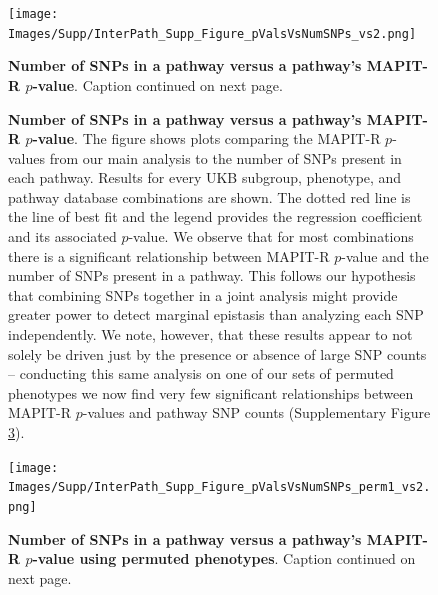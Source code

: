 \documentclass[12pt,a4paper]{article}
\begin{document}
\setlength{\footskip}{3cm}
\begin{figure}[htbp]
\centering
\vspace*{-2cm}
\texttt{[image: Images/Supp/InterPath\_Supp\_Figure\_pValsVsNumSNPs\_vs2.png]}
\caption[TBD]{\textbf{Number of SNPs in a pathway versus a pathway's MAPIT-R $p$-value}. Caption continued on next page.}
\label{InterPath-Supp-Figure-pValsVsNumSNPs}
\end{figure}
\clearpage
\setlength{\footskip}{1cm}

\addtocounter{figure}{-1}
\begin{figure} [t!]
  \caption{\textbf{Number of SNPs in a pathway versus a pathway's MAPIT-R $p$-value}. The figure shows plots comparing the MAPIT-R $p$-values from our main analysis to the number of SNPs present in each pathway. Results for every UKB subgroup, phenotype, and pathway database combinations are shown. The dotted red line is the line of best fit and the legend provides the regression coefficient and its associated $p$-value. We observe that for most combinations there is a significant relationship between MAPIT-R $p$-value and the number of SNPs present in a pathway. This follows our hypothesis that combining SNPs together in a joint analysis might provide greater power to detect marginal epistasis than analyzing each SNP independently. We note, however, that these results appear to not solely be driven just by the presence or absence of large SNP counts -- conducting this same analysis on one of our sets of permuted phenotypes we now find very few significant relationships between MAPIT-R $p$-values and pathway SNP counts (Supplementary Figure \ref{InterPath-Supp-Figure-pValsVsNumSNPs-perm1}).}
\label{InterPath-Supp-Figure-pValsVsNumSNPs-Caption}
\end{figure}
\clearpage

\setlength{\footskip}{3cm}
\begin{figure}[htbp]
\centering
\vspace*{-2cm}
\texttt{[image: Images/Supp/InterPath\_Supp\_Figure\_pValsVsNumSNPs\_perm1\_vs2.png]}
\caption[TBD]{\textbf{Number of SNPs in a pathway versus a pathway's MAPIT-R $p$-value using permuted phenotypes}. Caption continued on next page.}
\label{InterPath-Supp-Figure-pValsVsNumSNPs-perm1}
\end{figure}
\clearpage
\setlength{\footskip}{1cm}
\end{document}
